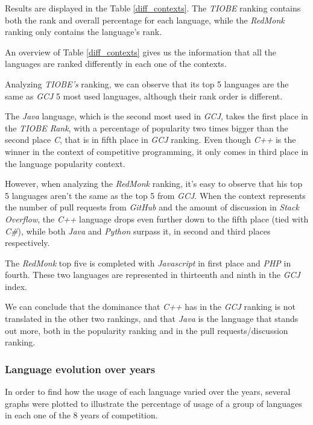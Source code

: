 \documentclass{article}
\begin{document}
\begin{multicols*}{2}
Results are displayed in the Table \ref{diff_contexts}. The \textit{TIOBE} ranking contains both the rank and overall percentage for each language, while the \textit{RedMonk} ranking only contains the language's rank.

An overview of Table \ref{diff_contexts} gives us the information that all the languages are ranked differently in each one of the contexts.


Analyzing \textit{TIOBE's} ranking, we can observe that its top 5 languages are the same as \textit{GCJ} 5 most used languages, although their rank order is different.

The \textit{Java} language, which is the second most used in \textit{GCJ}, takes the first place in the \textit{TIOBE Rank}, with a percentage of popularity two times bigger than the second place \textit{C}, that is in fifth place in \textit{GCJ} ranking. Even though \textit{C++} is the winner in the context of competitive programming, it only comes in third place in the language popularity context.


However, when analyzing the \textit{RedMonk} ranking, it's easy to observe that his top 5 languages aren't the same as the top 5 from \textit{GCJ}. When the context represents the number of pull requests from \textit{GitHub} and the amount of discussion in \textit{Stack Overflow}, the \textit{C++} language drops even further down to the fifth place (tied with \textit{C\#}), while both \textit{Java} and \textit{Python} surpass it, in second and third places respectively.

The \textit{RedMonk} top five is completed with \textit{Javascript} in first place and \textit{PHP} in fourth. These two languages are represented in thirteenth and ninth in the \textit{GCJ} index.

We can conclude that the dominance that \textit{C++} has in the \textit{GCJ} ranking is not translated in the other two rankings, and that \textit{Java} is the language that stands out more, both in the popularity ranking and in the pull requests/discussion ranking.


\subsubsection{Language evolution over years}

In order to find how the usage of each language varied over the years, several graphs were plotted to illustrate the percentage of usage of a group of languages in each one of the 8 years of competition.


\end{multicols*}
\end{document}
